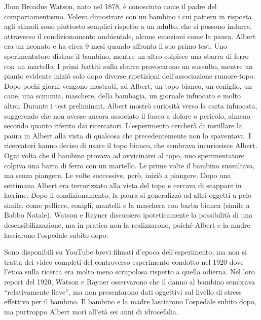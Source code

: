 \documentclass[12pt]{book} %
\begin{document}
\begin{mdframed}[linewidth=1pt]
Jhon Broadus Watson, nato nel 1878, è conosciuto come il padre del comportamentismo. Voleva dimostrare con un bambino i
cui pattern in risposta agli stimoli sono piuttosto semplici rispetto a un adulto, che si possono indurre, attraverso
il condizionamento ambientale, alcune emozioni come la paura. Albert era un neonato e ha circa 9 mesi quando
affronta il suo primo test. Uno sperimentatore distrae il bambino, mentre un altro colpisce una sbarra di ferro con un
martello. I primi battiti sulla sbarra provocarono un sussulto, mentre un pianto evidente iniziò solo dopo diverse ripetizioni dell’associazione rumore-topo. Dopo pochi giorni vengono mostrati, ad Albert, un topo bianco, un coniglio, un cane, una scimmia,
maschere, della bambagia, un giornale infuocato e molto altro. Durante i test preliminari, Albert mostrò curiosità verso la carta infuocata, suggerendo che non avesse ancora associato il fuoco a dolore o pericolo, almeno secondo quanto riferito dai ricercatori. L'esperimento
cercherà di instillare la paura in Albert alla vista di qualcosa che precedentemente non lo spaventava. I ricercatori
hanno deciso di usare il topo bianco, che sembrava incuriosisce Albert. Ogni volta che il bambino provava ad
avvicinarsi al topo, uno sperimentatore colpiva una barra di ferro con un martello. Le prime volte il bambino
sussultava, ma senza piangere. Le volte successive, però, iniziò a piangere. Dopo una settimana Albert era terrorizzato
alla vista del topo e cercava di scappare in lacrime. Dopo il condizionamento, la paura si generalizzò ad altri oggetti a pelo simile, come pellicce, conigli, mantelli e la maschera con barba bianca (simile a Babbo Natale). Watson e Rayner discussero ipoteticamente la possibilità di una desensibilizzazione, ma in pratica non la realizzarono, poiché Albert e la madre lasciarono l’ospedale subito dopo. 

Sono disponibili su YouTube brevi filmati d’epoca dell’esperimento, ma non si tratta dei video completi del controverso esperimento condotto nel 1920 dove l'etica sulla ricerca era molto meno scrupolosa rispetto a quella odierna. 
Nel loro report del 1920, Watson e Rayner osservarono che il danno al bambino sembrava “relativamente lieve”, ma non presentarono dati oggettivi sul livello di stress effettivo per il bambino. Il bambino e la madre lasciarono l'ospedale subito dopo, ma purtroppo Albert morì all'età sei anni di
idrocefalia.
\end{mdframed}
\end{document}
